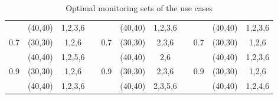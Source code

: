 \begin{table}[htbp]
{\begin{tabular}{ccccccccccc}
\multicolumn{1}{|c|}{}                     & \multicolumn{1}{c|}{(40,40)}     & \multicolumn{1}{c|}{1,2,3,6} & \multicolumn{1}{c|}{} & \multicolumn{1}{c|}{}                     & \multicolumn{1}{c|}{(40,40)}     & \multicolumn{1}{c|}{1,2,3,6} & \multicolumn{1}{c|}{} & \multicolumn{1}{c|}{}                     & \multicolumn{1}{c|}{(40,40)}     & \multicolumn{1}{c|}{1,2,3,6} \\ \cline{1-3} \cline{5-7} \cline{9-11} 
\multicolumn{1}{|c|}{\multirow{2}{*}{0.7}} & \multicolumn{1}{c|}{(30,30)}     & \multicolumn{1}{c|}{1,2,6}   & \multicolumn{1}{c|}{} & \multicolumn{1}{c|}{\multirow{2}{*}{0.7}} & \multicolumn{1}{c|}{(30,30)}     & \multicolumn{1}{c|}{2,3,6}   & \multicolumn{1}{c|}{} & \multicolumn{1}{c|}{\multirow{2}{*}{0.7}} & \multicolumn{1}{c|}{(30,30)}     & \multicolumn{1}{c|}{1,2,6}   \\ \cline{2-3} \cline{6-7} \cline{10-11} 
\multicolumn{1}{|c|}{}                     & \multicolumn{1}{c|}{(40,40)}     & \multicolumn{1}{c|}{1,2,5,6} & \multicolumn{1}{c|}{} & \multicolumn{1}{c|}{}                     & \multicolumn{1}{c|}{(40,40)}     & \multicolumn{1}{c|}{2,6}     & \multicolumn{1}{c|}{} & \multicolumn{1}{c|}{}                     & \multicolumn{1}{c|}{(40,40)}     & \multicolumn{1}{c|}{1,2,3,6} \\ \cline{1-3} \cline{5-7} \cline{9-11} 
\multicolumn{1}{|c|}{\multirow{2}{*}{0.9}} & \multicolumn{1}{c|}{(30,30)}     & \multicolumn{1}{c|}{1,2,6}   & \multicolumn{1}{c|}{} & \multicolumn{1}{c|}{\multirow{2}{*}{0.9}} & \multicolumn{1}{c|}{(30,30)}     & \multicolumn{1}{c|}{2,3,6}   & \multicolumn{1}{c|}{} & \multicolumn{1}{c|}{\multirow{2}{*}{0.9}} & \multicolumn{1}{c|}{(30,30)}     & \multicolumn{1}{c|}{1,2,6}   \\ \cline{2-3} \cline{6-7} \cline{10-11} 
\multicolumn{1}{|c|}{}                     & \multicolumn{1}{c|}{(40,40)}     & \multicolumn{1}{c|}{1,2,3,6} & \multicolumn{1}{c|}{} & \multicolumn{1}{c|}{}                     & \multicolumn{1}{c|}{(40,40)}     & \multicolumn{1}{c|}{2,3,5,6} & \multicolumn{1}{c|}{} & \multicolumn{1}{c|}{}                     & \multicolumn{1}{c|}{(40,40)}     & \multicolumn{1}{c|}{1,2,4,6} \\ \cline{1-3} \cline{5-7} \cline{9-11} 
\end{tabular}%
}
\caption{Optimal monitoring sets of the use cases}
\label{tab:mdp-usecase-optiset}
\end{table}